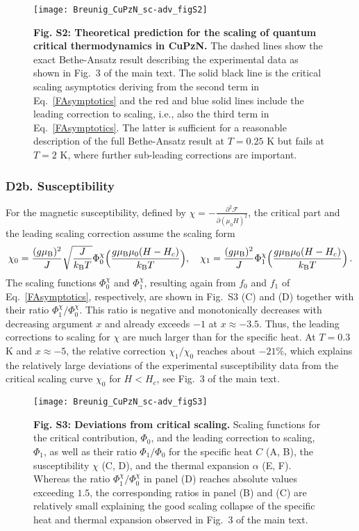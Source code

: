 \documentclass[12pt]{article}
\begin{document}
\begin{figure}[t!]
  \centering
  \texttt{[image: Breunig\_CuPzN\_sc-adv\_figS2]}  
  \caption{{\bf Fig. S2: Theoretical prediction for the scaling of quantum critical thermodynamics in CuPzN.} The dashed lines show the exact Bethe-Ansatz result describing the experimental data as shown in Fig.~3 of the main text. The solid black line is the critical scaling asymptotics deriving from the second term in Eq.~\eqref{FAsymptotics} and the red and blue solid lines include the leading correction to scaling, i.e., also the third term in Eq.~\eqref{FAsymptotics}. The latter is sufficient for a reasonable description of the full Bethe-Ansatz result at $T = 0.25$ K but fails at $T = 2$ K, where further sub-leading corrections are important.
}  
  \label{Fig_CorrectionToScaling}
 \end{figure}


\subsubsection*{D2b. Susceptibility}

For the magnetic susceptibility, defined by $\chi = -\frac{\partial^2\mathcal{F}}{\partial(\mu_0 H)^2}$, the critical part and the leading scaling correction assume the scaling form
%
\begin{align}
\chi_0 = \frac{(g\mu_{\rm B})^2}{J} \sqrt{\frac{J}{k_{\rm B} T}} \Phi_0^{\chi}\Big(\frac{g\mu_{\rm B} \mu_0 (H-H_c)}{k_{\rm B} T}\Big),\quad
\chi_{1} = \frac{(g\mu_{\rm B})^2}{J} \Phi^{\chi}_{1}\Big(\frac{g\mu_{\rm B} \mu_0 (H-H_c)}{k_{\rm B} T}\Big)\, .
\end{align}
%
The scaling functions  $\Phi^{\chi}_{0}$ and  $\Phi^{\chi}_{1}$, resulting again from $f_0$ and $f_1$ of Eq.~\eqref{FAsymptotics}, respectively, are shown in Fig.~{S3} (C) and (D) together with their ratio $\Phi^{\chi}_{1}/\Phi^{\chi}_{0}$. This ratio is negative and monotonically decreases with decreasing argument $x$ and already exceeds $-1$ at $x\approx -3.5$. Thus, the leading corrections to scaling for $\chi$ are much larger than for the specific heat. At $T = 0.3$ K and $x\approx -5$, the relative correction $\chi_1/\chi_0$ reaches about $-21\%$, which explains the relatively large deviations of the experimental susceptibility data from the critical scaling curve $\chi_0$ for $H<H_c$, see Fig.~3 of the main text. 

\begin{figure}[t!]
  \centering
  \texttt{[image: Breunig\_CuPzN\_sc-adv\_figS3]}  
  \caption{{\bf Fig. S3: Deviations from critical scaling.} Scaling functions for the critical contribution, $\Phi_0$, and the leading correction to scaling, $\Phi_1$, as well as their ratio $\Phi_1/\Phi_0$ for the specific heat $C$ (A, B), the susceptibility $\chi$ (C, D), and the thermal expansion $\alpha$ (E, F). Whereas the ratio $\Phi^\chi_1/\Phi^\chi_0$ in panel (D) reaches absolute values exceeding $1.5$, the corresponding ratios in panel (B) and (C) are relatively small explaining the good scaling collapse of the specific heat and thermal expansion observed in Fig.~3 of the main text.
}  
  \label{ScalingFunctions}
 \end{figure}
\end{document}
